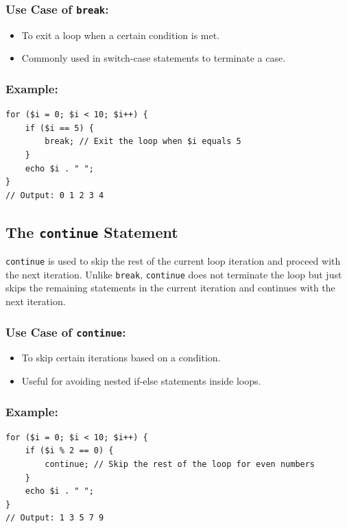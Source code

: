 \documentclass[11pt]{article}
\begin{document}
\subsubsection{Use Case of \texttt{break}:}
\label{sec:org5b9843f}
\begin{itemize}
\item To exit a loop when a certain condition is met.
\item Commonly used in switch-case statements to terminate a case.
\end{itemize}

\subsubsection{Example:}
\label{sec:orge69709b}
\begin{verbatim}
for ($i = 0; $i < 10; $i++) {
    if ($i == 5) {
        break; // Exit the loop when $i equals 5
    }
    echo $i . " ";
}
// Output: 0 1 2 3 4
\end{verbatim}

\subsection{The \texttt{continue} Statement}
\label{sec:org1c6713a}
\texttt{continue} is used to skip the rest of the current loop iteration and
proceed with the next iteration. Unlike \texttt{break}, \texttt{continue} does not
terminate the loop but just skips the remaining statements in the
current iteration and continues with the next iteration.

\subsubsection{Use Case of \texttt{continue}:}
\label{sec:org4d1b647}
\begin{itemize}
\item To skip certain iterations based on a condition.
\item Useful for avoiding nested if-else statements inside loops.
\end{itemize}

\subsubsection{Example:}
\label{sec:orgffe7985}
\begin{verbatim}
for ($i = 0; $i < 10; $i++) {
    if ($i % 2 == 0) {
        continue; // Skip the rest of the loop for even numbers
    }
    echo $i . " ";
}
// Output: 1 3 5 7 9
\end{verbatim}
\end{document}
